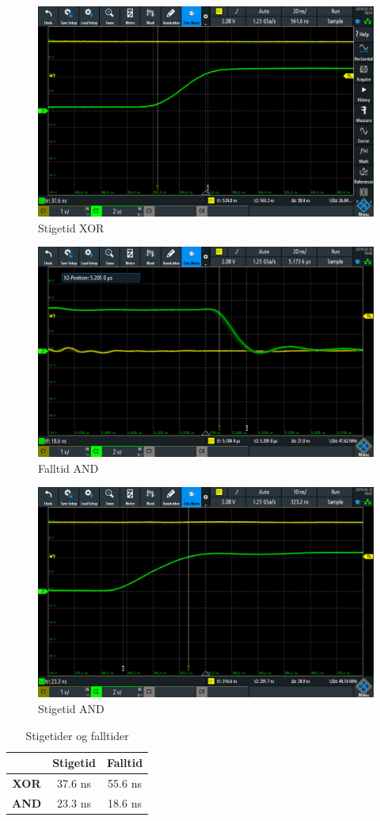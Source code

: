 \begin{figure}
  \centering
  \caption{Stigetid XOR}
  \includegraphics[width=14cm]{Bilder/Rise.png}
\end{figure}

\begin{figure}
  \centering
  \caption{Falltid AND}
  \includegraphics[width=14cm]{Bilder/Fall_and.png}
\end{figure}

\begin{figure}
  \centering
  \caption{Stigetid AND}
  \includegraphics[width=14cm]{Bilder/Rise_and.png}
\end{figure}


\begin{table}
  \centering
  \caption{Stigetider og falltider}
  \begin{tabular}{c|c c}
     & \textbf{Stigetid} & \textbf{Falltid} \\ \hline
     \textbf{XOR} & 37.6 ns & 55.6 ns \\
     \textbf{AND} & 23.3 ns & 18.6 ns \\

  \end{tabular}
  \label{stigetidstuff}
\end{table}
